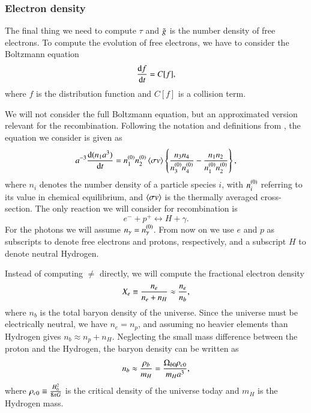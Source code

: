 \subsubsection{Electron density} \label{sssec:M2_electron_density}
The final thing we need to compute $\tau$ and $\g$ is the number density of free electrons. To compute the evolution of free electrons, we have to consider the Boltzmann equation \cite[Eq. (3.19)]{Dodelson}
\begin{equation} \label{eq:M2:theory:Boltzmann_equation}
    \dv{f}{t} = C[f],
\end{equation}
where $f$ is the distribution function and $C[f]$ is a collision term. 

We will not consider the full Boltzmann equation, but an approximated version relevant for the recombination. Following the notation and definitions from \cite[Eq. (4.5)-(4.9)]{Dodelson}, the equation we consider is given as  
\begin{equation} \label{eq:M2:theory:Boltzmann_equation_four_particles_scale_factor}
    a^{-3}\dv{(n_1 a^3)}{t} = \equilibriumn[1] \equilibriumn[2] \expval{\sigma v} \BBclosed{\frac{n_3 n_4}{\equilibriumn[3] \equilibriumn[4]} - \frac{n_1 n_2}{\equilibriumn[1] \equilibriumn[2]}},
\end{equation}
where $n_i$ denotes the number density of a particle species $i$, with $\equilibriumn[i]$ referring to its value in chemical equilibrium, and $\expval{\sigma v}$ is the thermally averaged cross-section. The only reaction we will consider for recombination is   
\begin{equation} \label{eq:M2:theory:electron_proton_to_hydrogen_photon}
    e^- + p^+ \leftrightarrow H + \gamma.
\end{equation}   
For the photons we will assume $n_\gamma = \equilibriumn[\gamma]$. From now on we use $e$ and $p$ as subscripts to denote free electrons and protons, respectively, and a subscript $H$ to denote neutral Hydrogen. 

Instead of computing $\ne$ directly, we will compute the fractional electron density
\begin{equation} \label{eq:M2:theory:X_e_definition}
    \Xe \equiv \frac{n_e}{n_e + n_H} \approx \frac{\ne}{n_b},
\end{equation}
where $n_b$ is the total baryon density of the universe. Since the universe must be electrically neutral, we have $n_e=n_p$, and assuming no heavier elements than Hydrogen gives $n_b\approx n_p+n_H$. Neglecting the small mass difference between the proton and the Hydrogen, the baryon density can be written as    
\begin{equation} \label{eq:M2:theory:helium_baryon_number_density}
    n_b \approx \frac{\rho_b}{m_H} = \frac{\obn \rhocn}{m_H a^3},
\end{equation}
where $\rhocn\equiv \frac{ H_0^2}{8\pi G}$ is the critical density of the universe today and $m_H$ is the Hydrogen mass. 

